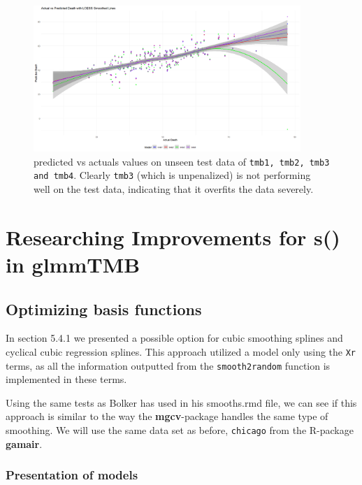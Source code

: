 \documentclass[12pt, twoside,hidelinks]{article}
\theoremstyle{definition}
\numberwithin{equation}{section}
\begin{document}
\begin{figure}[H]
    \centering
    \includegraphics[width=0.9\textwidth]{visuals/overfit_tmb1234_pred_vs_act.png}
    \caption{predicted vs actuals values on unseen test data of \texttt{tmb1, tmb2, tmb3 and tmb4}. Clearly \texttt{tmb3} (which is unpenalized) is not performing well on the test data, indicating that it overfits the data severely. }
    \label{fig:predicted_vs_actual_reglines_tmb1234}
\end{figure}




\section{Researching Improvements for \textbf{s()} in \textbf{glmmTMB}}



\subsection{Optimizing basis functions}

In section 5.4.1 we presented a possible option for cubic smoothing splines and cyclical cubic regression splines. 
This approach utilized a model only using the \texttt{Xr} terms, as all the information outputted from the \texttt{smooth2random} function is implemented in these terms.
\newline

Using the same tests as Bolker has used in his smooths.rmd file, we can see if this approach is similar to the way the \textbf{mgcv}-package handles the same type of smoothing. We will use the same data set as before, \texttt{chicago} from the R-package \textbf{gamair}.


\subsubsection{Presentation of models}
\end{document}
